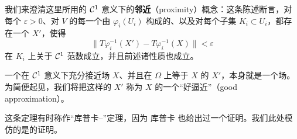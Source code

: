 我们来澄清这里所用的 $\mathcal{C}^1$ 意义下的\textbf{邻近}（proximity）概念：这条陈述断言，对每个 $\varepsilon>0$、对 $V$ 的每一个由\trChart{} $\varphi_i(U_i)$ 构成的\trCovering、以及对每个\trCompact{}子集 $K_i\subset U_i$，都存在一个\trVectorField{} $X'$，使得
\[
\bigl\|T\varphi_i^{-1}(X')-T\varphi_i^{-1}(X)\bigr\|<\varepsilon
\]
在 $K_i$ 上关于 $\mathcal{C}^1$ 范数成立，并且前述诸性质也成立。

\begin{remark}\label{thm:good-approximation}
一个在 $\mathcal{C}^1$ 意义下充分接近\trPseudogradient{}场 $X$、并且在 $\Omega$ 上等于 $X$ 的\trVectorField{} $X'$，本身就是一个\trPseudogradient{}场。为简便起见，我们将把这样的 $X'$ 称为 $X$ 的一个“好逼近”（good approximation）。
\end{remark}

\begin{remark}\label{thm:kupka-smale}
这条定理有时称作“库普卡--\trSmale”定理，因为 库普卡 也给出过一个证明。我们此处模仿的是\trSmale{}的证明。
\end{remark}

